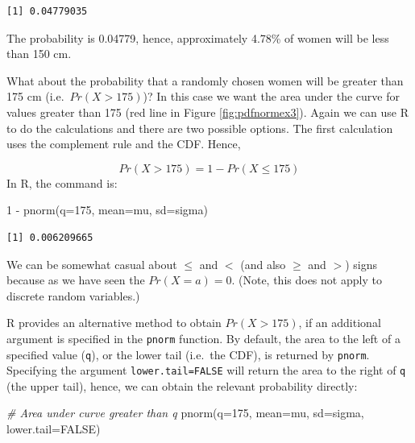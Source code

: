 \documentclass[
  oneside]{krantz}
\newenvironment{Shaded}{\begin{snugshade}}{\end{snugshade}}
\newcommand{\AttributeTok}[1]{\textcolor[rgb]{0.77,0.63,0.00}{#1}}
\newcommand{\CommentTok}[1]{\textcolor[rgb]{0.56,0.35,0.01}{\textit{#1}}}
\newcommand{\ConstantTok}[1]{\textcolor[rgb]{0.00,0.00,0.00}{#1}}
\newcommand{\DecValTok}[1]{\textcolor[rgb]{0.00,0.00,0.81}{#1}}
\newcommand{\FunctionTok}[1]{\textcolor[rgb]{0.00,0.00,0.00}{#1}}
\newcommand{\NormalTok}[1]{#1}
\newcommand{\SpecialCharTok}[1]{\textcolor[rgb]{0.00,0.00,0.00}{#1}}
\begin{document}
\begin{verbatim}
[1] 0.04779035
\end{verbatim}

The probability is 0.04779, hence, approximately 4.78\% of women will be less than 150 cm.

What about the probability that a randomly chosen women will be greater than 175 cm (i.e.~\(Pr(X > 175)\))? In this case we want the area under the curve for values greater than 175 (red line in Figure \ref{fig:pdfnormex3}). Again we can use R to do the calculations and there are two possible options. The first calculation uses the complement rule and the CDF. Hence,

\[Pr(X > 175) = 1 - Pr(X \le 175)\]
In R, the command is:

\begin{Shaded}
\begin{Highlighting}[]
\DecValTok{1} \SpecialCharTok{{-}} \FunctionTok{pnorm}\NormalTok{(}\AttributeTok{q=}\DecValTok{175}\NormalTok{, }\AttributeTok{mean=}\NormalTok{mu, }\AttributeTok{sd=}\NormalTok{sigma)}
\end{Highlighting}
\end{Shaded}

\begin{verbatim}
[1] 0.006209665
\end{verbatim}

We can be somewhat casual about \(\le\) and \(<\) (and also \(\ge\) and \(>\)) signs because as we have seen the \(Pr(X=a) = 0\). (Note, this does not apply to discrete random variables.)

R provides an alternative method to obtain \(Pr(X > 175)\), if an additional argument is specified in the \texttt{pnorm} function. By default, the area to the left of a specified value (\texttt{q}), or the lower tail (i.e.~the CDF), is returned by \texttt{pnorm}. Specifying the argument \texttt{lower.tail=FALSE} will return the area to the right of \texttt{q} (the upper tail), hence, we can obtain the relevant probability directly:

\begin{Shaded}
\begin{Highlighting}[]
\CommentTok{\# Area under curve greater than q}
\FunctionTok{pnorm}\NormalTok{(}\AttributeTok{q=}\DecValTok{175}\NormalTok{, }\AttributeTok{mean=}\NormalTok{mu, }\AttributeTok{sd=}\NormalTok{sigma, }\AttributeTok{lower.tail=}\ConstantTok{FALSE}\NormalTok{)}
\end{Highlighting}
\end{Shaded}
\end{document}
